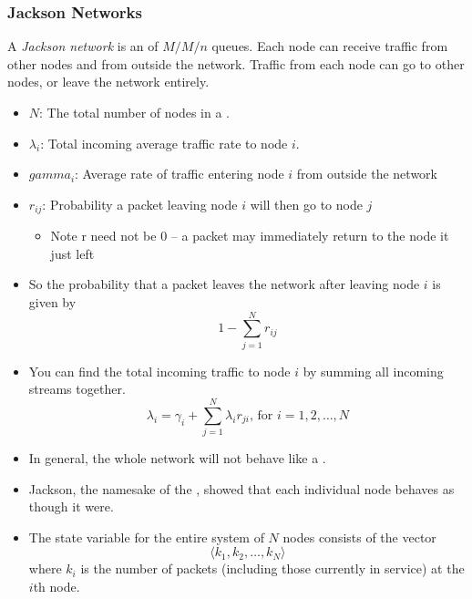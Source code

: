 \subsubsection{Jackson Networks}\label{subsubsec:Jackson_Networks}
\begin{definition}\label{def:Jackson_Network}
  A \emph{Jackson network} is an  of $M/M/n$ queues.
  Each node can receive traffic from other nodes and from outside the network.
  Traffic from each node can go to other nodes, or leave the network entirely.
\end{definition}

\begin{itemize}[noitemsep]
\item $N$: The total number of nodes in a .
\item $\lambda_{i}$: Total incoming average traffic rate to node $i$.
\item $gamma_{i}$: Average rate of traffic entering node $i$ from outside the network
\item $r_{ij}$: Probability a packet leaving node $i$ will then go to node $j$
  \begin{itemize}[noitemsep]
  \item Note r need not be 0 – a packet may immediately return to the node it just left
  \end{itemize}
\item So the probability that a packet leaves the network after leaving node $i$ is given by
  \begin{equation}\label{eq:Prob_Packet_LEaves_Network}
    1 - \sum\limits_{j=1}^{N} r_{ij}
  \end{equation}

\item You can find the total incoming traffic to node $i$ by summing all incoming streams together.
  \begin{equation}\label{eq:Total_Incoming-Traffic}
    \lambda_{i} = \gamma_{i} + \sum\limits_{j=1}^{N} \lambda_{i} r_{ji} \text{, for } i = 1, 2, \ldots, N
  \end{equation}

\item In general, the whole network will not behave like a .
\item Jackson, the namesake of the , showed that each individual node behaves as though it were.
\item The state variable for the entire system of $N$ nodes consists of the vector
  \begin{equation}\label{eq:Queuing_Network_State_Vector}
    \langle k_{1}, k_{2}, \ldots, k_{N} \rangle
  \end{equation}
  where $k_{i}$ is the number of packets (including those currently in service) at the $i$th node.


\end{itemize}
